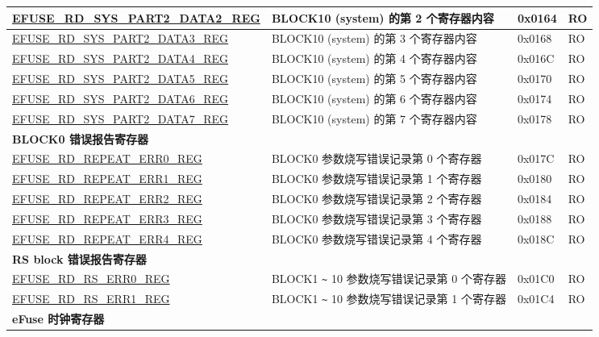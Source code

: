 \begin{longtable}{ | p{7cm} | p{7.2cm} | p{1.3cm} | p{1cm} | }
\hyperref[regdesc:EFUSERDSYSPART2DATANREG]{EFUSE\_RD\_SYS\_PART2\_DATA2\_REG} & BLOCK10 (system) 的第 2 个寄存器内容 & 0x0164 & RO \\ \hline
\hyperref[regdesc:EFUSERDSYSPART2DATANREG]{EFUSE\_RD\_SYS\_PART2\_DATA3\_REG} & BLOCK10 (system) 的第 3 个寄存器内容 & 0x0168 & RO \\ \hline
\hyperref[regdesc:EFUSERDSYSPART2DATANREG]{EFUSE\_RD\_SYS\_PART2\_DATA4\_REG} & BLOCK10 (system) 的第 4 个寄存器内容 & 0x016C & RO \\ \hline
\hyperref[regdesc:EFUSERDSYSPART2DATANREG]{EFUSE\_RD\_SYS\_PART2\_DATA5\_REG} & BLOCK10 (system) 的第 5 个寄存器内容 & 0x0170 & RO \\ \hline
\hyperref[regdesc:EFUSERDSYSPART2DATANREG]{EFUSE\_RD\_SYS\_PART2\_DATA6\_REG} & BLOCK10 (system) 的第 6 个寄存器内容 & 0x0174 & RO \\ \hline
\hyperref[regdesc:EFUSERDSYSPART2DATANREG]{EFUSE\_RD\_SYS\_PART2\_DATA7\_REG} & BLOCK10 (system) 的第 7 个寄存器内容 & 0x0178 & RO \\ \hline
\multicolumn{4}{|l|}{\textbf{BLOCK0 错误报告寄存器}} \\ \hline
\hyperref[regdesc:EFUSERDREPEATERR0REG]{EFUSE\_RD\_REPEAT\_ERR0\_REG} & BLOCK0 参数烧写错误记录第 0 个寄存器 & 0x017C & RO \\ \hline
\hyperref[regdesc:EFUSERDREPEATERR1REG]{EFUSE\_RD\_REPEAT\_ERR1\_REG} & BLOCK0 参数烧写错误记录第 1 个寄存器 & 0x0180 & RO \\ \hline
\hyperref[regdesc:EFUSERDREPEATERR2REG]{EFUSE\_RD\_REPEAT\_ERR2\_REG} & BLOCK0 参数烧写错误记录第 2 个寄存器 & 0x0184 & RO \\ \hline
\hyperref[regdesc:EFUSERDREPEATERR3REG]{EFUSE\_RD\_REPEAT\_ERR3\_REG} & BLOCK0 参数烧写错误记录第 3 个寄存器 & 0x0188 & RO \\ \hline
\hyperref[regdesc:EFUSERDREPEATERR4REG]{EFUSE\_RD\_REPEAT\_ERR4\_REG} & BLOCK0 参数烧写错误记录第 4 个寄存器 & 0x018C & RO \\ \hline
\multicolumn{4}{|l|}{\textbf{RS block 错误报告寄存器}} \\ \hline
\hyperref[regdesc:EFUSERDRSERR0REG]{EFUSE\_RD\_RS\_ERR0\_REG} & BLOCK1 \verb+~+ 10 参数烧写错误记录第 0 个寄存器 & 0x01C0 & RO \\ \hline
\hyperref[regdesc:EFUSERDRSERR1REG]{EFUSE\_RD\_RS\_ERR1\_REG} & BLOCK1 \verb+~+ 10 参数烧写错误记录第 1 个寄存器 & 0x01C4 & RO \\ \hline
\multicolumn{4}{|l|}{\textbf{eFuse 时钟寄存器}} \\ \hline

\end{longtable}
